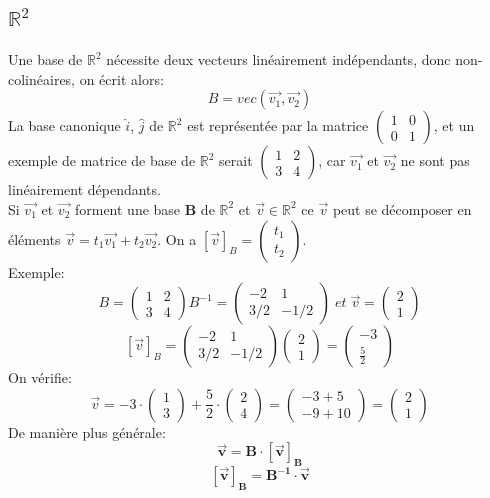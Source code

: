\documentclass[10pt,a4paper]{book}
\newcommand{\R}{\mathbb{R}}
\begin{document}
\subsection{\texorpdfstring{$\R^2$}{R2}}

Une base de $\R^2 $ nécessite deux vecteurs linéairement indépendants, donc non-colinéaires, on écrit alors:
\[B = vec\left(\vec{v_1}, \vec{v_2}\right)\]
La base canonique $\hat{i}$, $\hat{j}$ de $\R^2$ est représentée par la matrice \(\begin{pmatrix}
1 & 0 \\ 0 & 1 \end{pmatrix}\), et un exemple de matrice de base de $\R^2$ serait \(\begin{pmatrix}1 & 2 \\ 3 & 4\end{pmatrix}\), car $\vec{v_1}$ et $\vec{v_2}$ ne sont pas linéairement dépendants. \\
Si $\vec{v_1}$ et $\vec{v_2}$ forment une base \textbf{B} de $\R^2$ et $\vec{v} \in \R^2$ ce $\vec{v}$ peut se décomposer en éléments \(\vec{v} = t_1\vec{v_1} + t_2\vec{v_2}\). On a $[\vec{v}]_B = \begin{pmatrix} t_1 \\ t_2 \end{pmatrix}$. \\
Exemple:
\[B = \begin{pmatrix}1 & 2 \\ 3 & 4\end{pmatrix} B^{-1} = \begin{pmatrix}-2 & 1 \\ 3/2 & -1/2\end{pmatrix} \; et \; \vec{v} = \begin{pmatrix} 2 \\ 1 \end{pmatrix}\]
\[[\vec{v}]_B = \begin{pmatrix}-2 & 1 \\ 3/2 & -1/2\end{pmatrix}\begin{pmatrix} 2 \\ 1 \end{pmatrix} = \begin{pmatrix} -3 \\ \frac{5}{2} \end{pmatrix}\]
On vérifie:
\[\vec{v} = -3\cdot \begin{pmatrix}1 \\ 3\end{pmatrix} + \frac{5}{2}\cdot \begin{pmatrix} 2 \\ 4 \end{pmatrix} = \begin{pmatrix} -3+5 \\ -9+10 \end{pmatrix} = \begin{pmatrix} 2 \\ 1 \end{pmatrix}\]
De manière plus générale:
\[\mathbf{\vec{v} = B\cdot [\vec{v}]_B}\]
\[\mathbf{[\vec{v}]_B = B^{-1}\cdot \vec{v}}\]
\end{document}
